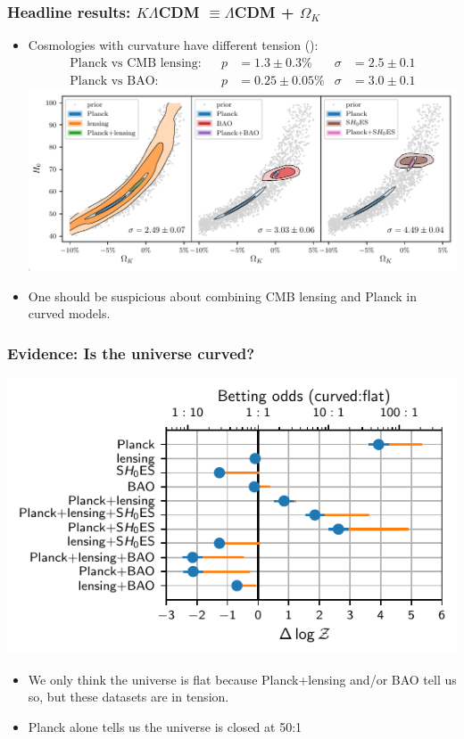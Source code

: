 \documentclass[%
]{beamer}
\begin{document}
\begin{frame}
    \frametitle{Headline results: $K\Lambda$CDM $\equiv\Lambda$CDM + $\Omega_K$}
    \begin{itemize}
        \item Cosmologies with curvature have different tension ():
            \begin{align}
                \text{Planck vs CMB lensing}:&      &p&=  1.3\pm 0.3 \% &\sigma& =2.5\pm0.1\nonumber\\
                \text{Planck vs BAO}:&      &p&=   0.25\pm 0.05 \% &\sigma& = 3.0 \pm 0.1 \nonumber
            \end{align}
		\includegraphics[width=\textwidth]{figures/omegak_H0.pdf}
        \item One should be suspicious about combining CMB lensing and Planck in curved models.
    \end{itemize}
\end{frame}

\begin{frame}
    \frametitle{Evidence: Is the universe curved?}
    \includegraphics{figures/evidences.pdf}
    \begin{itemize}
        \item We only think the universe is flat because Planck+lensing and/or BAO tell us so, but these datasets are in tension.
        \item Planck alone tells us the universe is closed at 50:1
    \end{itemize}
\end{frame}
\end{document}
